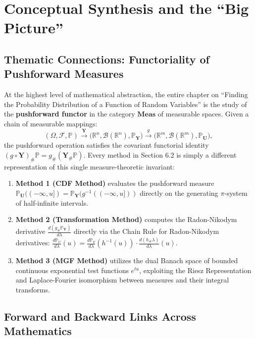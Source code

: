\documentclass[11pt, letterpaper]{article}
\theoremstyle{definition}
\theoremstyle{remark}
\newcommand{\R}{\mathbb{R}}
\newcommand{\Prob}{\mathbb{P}}
\newcommand{\F}{\mathcal{F}}
\begin{document}
\newpage
\section{Conceptual Synthesis and the ``Big Picture''}

\subsection{Thematic Connections: Functoriality of Pushforward Measures}

At the highest level of mathematical abstraction, the entire chapter on ``Finding the Probability Distribution of a Function of Random Variables'' is the study of the \textbf{pushforward functor} in the category $\mathbf{Meas}$ of measurable spaces. Given a chain of measurable mappings:
\[
    (\Omega, \F, \Prob) \xrightarrow{\;\mathbf{Y}\;} \big(\R^n, \mathcal{B}(\R^n), \Prob_{\mathbf{Y}}\big) \xrightarrow{\;g\;} \big(\R^m, \mathcal{B}(\R^m), \Prob_{\mathbf{U}}\big),
\]
the pushforward operation satisfies the covariant functorial identity $(g \circ \mathbf{Y})_\# \Prob = g_\# (\mathbf{Y}_\# \Prob)$. Every method in Section 6.2 is simply a different representation of this single measure-theoretic invariant:
\begin{enumerate}[label=(\roman*)]
    \item \textbf{Method 1 (CDF Method)} evaluates the pushforward measure $\Prob_{\mathbf{U}}((-\infty, u]) = \Prob_{\mathbf{Y}}(g^{-1}((-\infty, u]))$ directly on the generating $\pi$-system of half-infinite intervals.
    \item \textbf{Method 2 (Transformation Method)} computes the Radon-Nikodym derivative $\frac{d(g_\# \Prob_{\mathbf{Y}})}{d\lambda}$ directly via the Chain Rule for Radon-Nikodym derivatives: $\frac{d\Prob_U}{d\lambda}(u) = \frac{d\Prob_Y}{d\lambda}(h^{-1}(u)) \cdot \frac{d(h_\# \lambda)}{d\lambda}(u)$.
    \item \textbf{Method 3 (MGF Method)} utilizes the dual Banach space of bounded continuous exponential test functions $e^{tu}$, exploiting the Riesz Representation and Laplace-Fourier isomorphism between measures and their integral transforms.
\end{enumerate}

\subsection{Forward and Backward Links Across Mathematics}
\end{document}
